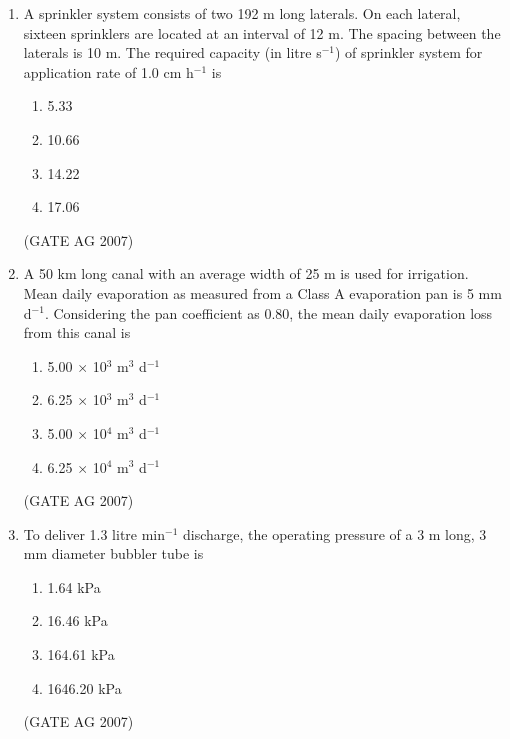 \documentclass[journal,12pt,onecolumn]{IEEEtran}
\theoremstyle{remark}
\begin{document}
\begin{enumerate}
\item  A sprinkler system consists of two 192 m long laterals. On each lateral, sixteen sprinklers are located at an interval of 12 m. The spacing between the laterals is 10 m. The required capacity (in litre s$^{-1}$) of sprinkler system for application rate of 1.0 cm h$^{-1}$ is
\begin{multicols}{4}
\begin{enumerate}
    \item 5.33
    \item 10.66
    \item 14.22
    \item 17.06
\end{enumerate}
\end{multicols}
\hfill(GATE AG 2007)

\item  A 50 km long canal with an average width of 25 m is used for irrigation. Mean daily evaporation as measured from a Class A evaporation pan is 5 mm d$^{-1}$. Considering the pan coefficient as 0.80, the mean daily evaporation loss from this canal is
\begin{multicols}{4}
\begin{enumerate}
    \item 5.00 $\times$ 10$^{3}$ m$^{3}$ d$^{-1}$
    \item 6.25 $\times$ 10$^{3}$ m$^{3}$ d$^{-1}$
    \item 5.00 $\times$ 10$^{4}$ m$^{3}$ d$^{-1}$
    \item  6.25 $\times$ 10$^{4}$ m$^{3}$ d$^{-1}$
\end{enumerate}
\end{multicols}
\hfill(GATE AG 2007)

\item To deliver 1.3 litre min$^{-1}$ discharge, the operating pressure of a 3 m long, 3 mm diameter bubbler tube is
\begin{multicols}{4}
\begin{enumerate}
    \item 1.64 kPa
    \item 16.46 kPa
    \item 164.61 kPa
    \item 1646.20 kPa
\end{enumerate}
\end{multicols}
\hfill(GATE AG 2007)


\end{enumerate}
\end{document}
